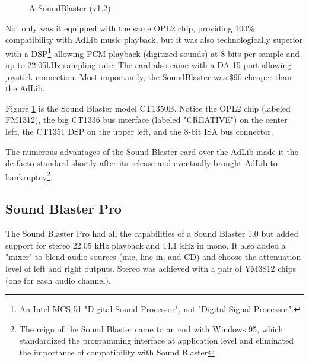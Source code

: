 \documentclass[book.tex]{subfiles}
\begin{document}
\begin{figure}[H] 
  \centering 
  \caption{A SoundBlaster (v1.2). }
  \label{asb12}
\end{figure}
\par
Not only was it equipped with the same OPL2 chip, providing 100\% compatibility with AdLib music playback, but it was also technologically superior with a DSP\footnote{An Intel MCS-51 "Digital Sound Processor", not "Digital Signal Processor".}  allowing PCM playback (digitized sounds) at 8 bits per sample and up to 22.05kHz sampling rate. The card also came with a DA-15 port allowing joystick connection. Most importantly, the SoundBlaster was \$90 cheaper than the AdLib.\\
\par
Figure \ref{asb12} is the Sound Blaster model CT1350B. Notice the OPL2 chip (labeled FM1312), the big CT1336 bus interface (labeled "CREATIVE") on the center left, the CT1351 DSP on the upper left, and the 8-bit ISA bus connector.\\
\par
   The numerous advantages of the Sound Blaster card over the AdLib made it the de-facto standard shortly after its release and eventually brought AdLib to bankruptcy\footnote{The reign of the Sound Blaster came to an end with Windows 95, which standardized the programming interface at application level and eliminated the importance of compatibility with Sound Blaster}.





  \subsection{Sound Blaster Pro}
The Sound Blaster Pro had all the capabilities of a Sound Blaster 1.0 but added support for stereo 22.05 kHz playback and 44.1 kHz in mono. It also added a "mixer" to blend audio sources (mic, line in, and CD) and choose the attenuation level of left and right outputs. Stereo was achieved with a pair of YM3812 chips (one for each audio channel).\\\label{sbmixerpage}

\end{document}
